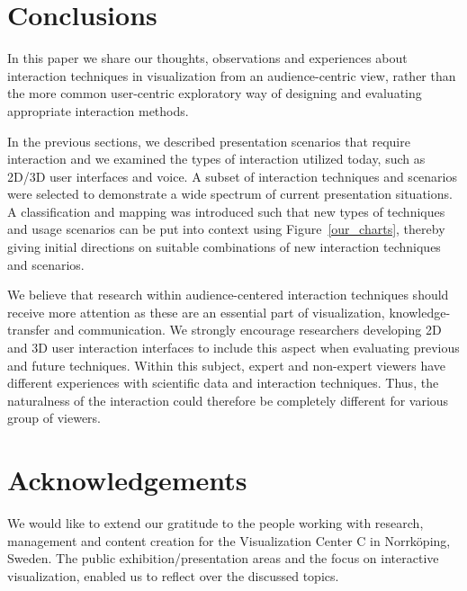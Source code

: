 \documentclass[journal]{vgtc}                %
\begin{document}
\section{Conclusions}\label{sec:conclusion}

In this paper we share our thoughts, observations and experiences about interaction techniques in visualization from an audience-centric view, rather than the more common user-centric exploratory way of designing and evaluating appropriate interaction methods.

In the previous sections, we described presentation scenarios that require interaction and we examined the types of interaction utilized today, such as 2D/3D user interfaces and voice.
A subset of interaction techniques and scenarios were selected to demonstrate a wide spectrum of current presentation situations.
A classification and mapping was introduced such that new types of techniques and usage scenarios can be put into context using Figure~\ref{our_charts}, thereby giving initial directions on suitable combinations of new interaction techniques and scenarios.

We believe that research within audience-centered interaction techniques should receive more attention as these are an essential part of visualization, knowledge-transfer and communication. 
We strongly encourage researchers developing 2D and 3D user interaction interfaces to include this aspect when evaluating previous and future techniques.
Within this subject, expert and non-expert viewers have different experiences with scientific data and interaction techniques. Thus, the naturalness of the interaction could therefore be completely different for various group of viewers.

\section*{Acknowledgements}We would like to extend our gratitude to the people working with research, management and content creation for the Visualization Center C in Norrk\"oping, Sweden. The public exhibition/presentation areas and the focus on interactive visualization, enabled us to reflect over the discussed topics.



\end{document}
